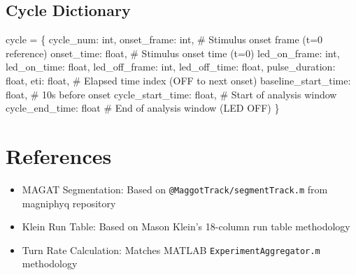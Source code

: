 \documentclass[
  11pt,
]{article}
\newenvironment{Shaded}{\begin{snugshade}}{\end{snugshade}}
\newcommand{\BuiltInTok}[1]{\textcolor[rgb]{0.00,0.23,0.31}{#1}}
\newcommand{\CommentTok}[1]{\textcolor[rgb]{0.37,0.37,0.37}{#1}}
\newcommand{\NormalTok}[1]{\textcolor[rgb]{0.00,0.23,0.31}{#1}}
\newcommand{\OperatorTok}[1]{\textcolor[rgb]{0.37,0.37,0.37}{#1}}
\newcommand{\StringTok}[1]{\textcolor[rgb]{0.13,0.47,0.30}{#1}}
\providecommand{\tightlist}{%
  \setlength{\itemsep}{0pt}\setlength{\parskip}{0pt}}\usepackage{longtable,booktabs,array}
\begin{document}
\hypertarget{cycle-dictionary}{%
\subsection{Cycle Dictionary}\label{cycle-dictionary}}

\begin{Shaded}
\begin{Highlighting}[]
\NormalTok{cycle }\OperatorTok{=}\NormalTok{ \{}
    \StringTok{\textquotesingle{}cycle\_num\textquotesingle{}}\NormalTok{: }\BuiltInTok{int}\NormalTok{,}
    \StringTok{\textquotesingle{}onset\_frame\textquotesingle{}}\NormalTok{: }\BuiltInTok{int}\NormalTok{,  }\CommentTok{\# Stimulus onset frame (t=0 reference)}
    \StringTok{\textquotesingle{}onset\_time\textquotesingle{}}\NormalTok{: }\BuiltInTok{float}\NormalTok{,  }\CommentTok{\# Stimulus onset time (t=0)}
    \StringTok{\textquotesingle{}led\_on\_frame\textquotesingle{}}\NormalTok{: }\BuiltInTok{int}\NormalTok{,}
    \StringTok{\textquotesingle{}led\_on\_time\textquotesingle{}}\NormalTok{: }\BuiltInTok{float}\NormalTok{,}
    \StringTok{\textquotesingle{}led\_off\_frame\textquotesingle{}}\NormalTok{: }\BuiltInTok{int}\NormalTok{,}
    \StringTok{\textquotesingle{}led\_off\_time\textquotesingle{}}\NormalTok{: }\BuiltInTok{float}\NormalTok{,}
    \StringTok{\textquotesingle{}pulse\_duration\textquotesingle{}}\NormalTok{: }\BuiltInTok{float}\NormalTok{,}
    \StringTok{\textquotesingle{}eti\textquotesingle{}}\NormalTok{: }\BuiltInTok{float}\NormalTok{,  }\CommentTok{\# Elapsed time index (OFF to next onset)}
    \StringTok{\textquotesingle{}baseline\_start\_time\textquotesingle{}}\NormalTok{: }\BuiltInTok{float}\NormalTok{,  }\CommentTok{\# 10s before onset}
    \StringTok{\textquotesingle{}cycle\_start\_time\textquotesingle{}}\NormalTok{: }\BuiltInTok{float}\NormalTok{,  }\CommentTok{\# Start of analysis window}
    \StringTok{\textquotesingle{}cycle\_end\_time\textquotesingle{}}\NormalTok{: }\BuiltInTok{float}  \CommentTok{\# End of analysis window (LED OFF)}
\NormalTok{\}}
\end{Highlighting}
\end{Shaded}

\hypertarget{references}{%
\section{References}\label{references}}

\begin{itemize}
\tightlist
\item
  MAGAT Segmentation: Based on \texttt{@MaggotTrack/segmentTrack.m} from
  magniphyq repository
\item
  Klein Run Table: Based on Mason Klein's 18-column run table
  methodology
\item
  Turn Rate Calculation: Matches MATLAB \texttt{ExperimentAggregator.m}
  methodology
\end{itemize}
\end{document}
